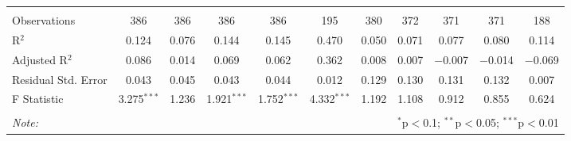 \begin{table}[H]
\begin{tabular}{@{\extracolsep{4pt}}lcccccccccc}
  & & & & & & & & & & \\ 
\hline \\[-1.8ex] 
Observations & 386 & 386 & 386 & 386 & 195 & 380 & 372 & 371 & 371 & 188 \\ 
R$^{2}$ & 0.124 & 0.076 & 0.144 & 0.145 & 0.470 & 0.050 & 0.071 & 0.077 & 0.080 & 0.114 \\ 
Adjusted R$^{2}$ & 0.086 & 0.014 & 0.069 & 0.062 & 0.362 & 0.008 & 0.007 & $-$0.007 & $-$0.014 & $-$0.069 \\ 
Residual Std. Error & 0.043 & 0.045 & 0.043 & 0.044 & 0.012 & 0.129 & 0.130 & 0.131 & 0.132 & 0.007 \\ 
F Statistic & 3.275$^{***}$ & 1.236 & 1.921$^{***}$ & 1.752$^{***}$ & 4.332$^{***}$ & 1.192 & 1.108 & 0.912 & 0.855 & 0.624 \\ 
\hline 
\hline \\[-1.8ex] 
\textit{Note:}  & \multicolumn{10}{r}{$^{*}$p$<$0.1; $^{**}$p$<$0.05; $^{***}$p$<$0.01} \\ 
\end{tabular} 
\end{table} 
